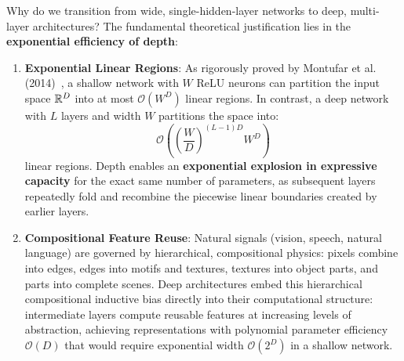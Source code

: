 Why do we transition from wide, single-hidden-layer networks to deep, multi-layer architectures? The fundamental theoretical justification lies in the \textbf{exponential efficiency of depth}:
\begin{enumerate}[noitemsep,topsep=2pt,parsep=0pt,partopsep=0pt]
  \item \textbf{Exponential Linear Regions}: As rigorously proved by Montufar et al. (2014)~\cite{montufar2014number}, a shallow network with $W$ ReLU neurons can partition the input space $\mathbb{R}^D$ into at most $\mathcal{O}(W^D)$ linear regions. In contrast, a deep network with $L$ layers and width $W$ partitions the space into:
  \begin{equation}
  \mathcal{O}\left( \left(\frac{W}{D}\right)^{(L-1)D} W^D \right)
  \label{eq:deep_linear_regions}
  \end{equation}
  linear regions. Depth enables an \textbf{exponential explosion in expressive capacity} for the exact same number of parameters, as subsequent layers repeatedly fold and recombine the piecewise linear boundaries created by earlier layers.
  \item \textbf{Compositional Feature Reuse}: Natural signals (vision, speech, natural language) are governed by hierarchical, compositional physics: pixels combine into edges, edges into motifs and textures, textures into object parts, and parts into complete scenes. Deep architectures embed this hierarchical compositional inductive bias directly into their computational structure: intermediate layers compute reusable features at increasing levels of abstraction, achieving representations with polynomial parameter efficiency $\mathcal{O}(D)$ that would require exponential width $\mathcal{O}(2^D)$ in a shallow network.
\end{enumerate}

